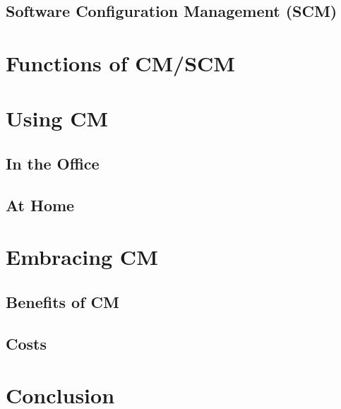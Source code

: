 \documentclass[cmpstyle]{ueacmpstyle}
\begin{document}
		\subsection{Software Configuration Management (SCM)} \label{sec:scm}
		
	\section{Functions of CM/SCM} \label{sec:principles}
	
	\section{Using CM} \label{sec:using}
	
		\subsection{In the Office} \label{sec:office}
		
		\subsection{At Home} \label{sec:home}
		
	\section{Embracing CM} \label{sec:embracing}
	
		\subsection{Benefits of CM} \label{sec:benefits}
		
		\subsection{Costs} \label{sec:costs}
		
	\section{Conclusion} \label{sec:conc}
	
	
	
\end{document}
